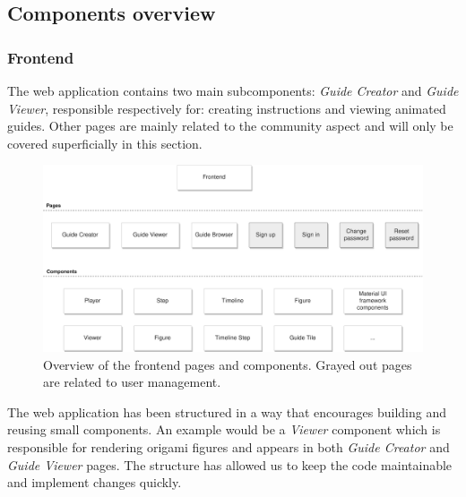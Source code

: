 \subsection{Components overview}

\subsubsection{Frontend}

The web application contains two main subcomponents: \textit{Guide Creator} and \textit{Guide Viewer}, responsible respectively for: creating instructions and viewing animated guides. Other pages are mainly related to the community aspect and will only be covered superficially in this section.

\begin{figure}[H]
  \caption{Overview of the frontend pages and components. Grayed out pages are related to user management.}
  \centering
    \includegraphics[width=\textwidth]{assets/3-frontend-architecture.png}
\end{figure}

The web application has been structured in a way that encourages building and reusing small components. An example would be a \textit{Viewer} component which is responsible for rendering origami figures and appears in both \textit{Guide Creator} and \textit{Guide Viewer} pages. The structure has allowed us to keep the code maintainable and implement changes quickly.

\medskip

